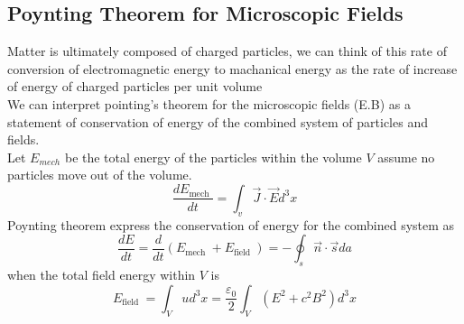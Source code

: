 \subsection{Poynting Theorem for Microscopic Fields}
Matter is ultimately composed of charged particles, we can think of this rate of conversion of electromagnetic energy to machanical energy as the rate of increase of energy of charged particles per unit volume\\
We can interpret pointing's theorem for the microscopic fields (E.B) as a statement of conservation of energy of the combined system of particles and fields.\\
Let $E_{mech}$ be the total energy of the particles within the volume $V$ assume no particles move out of the volume.
$$\frac{d E_{\text {mech }}}{d t}=\int_{v} \vec{J} \cdot \vec{E} d^{3} x$$
Poynting theorem express the conservation of energy for the combined system as
$$\frac{d E}{d t}=\frac{d}{d t}\left(E_{\text {mech }}+E_{\text {field }}\right)=-\oint_{s} \vec{n} \cdot \vec{s} d a$$
when the total field energy within $V$ is
$$E_{\text {field } }=\int_{V} u d^{3} x=\frac{\varepsilon_{0}}{2} \int_{V}\left(E^{2}+c^{2} B^{2}\right) d^{3} x$$
